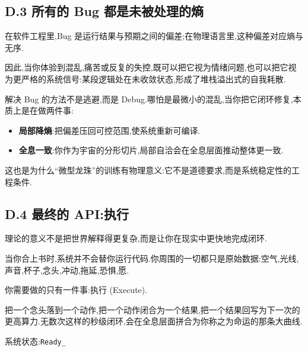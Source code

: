 \subsection*{D.3 所有的 Bug 都是未被处理的熵}

在软件工程里,Bug 是运行结果与预期之间的偏差;在物理语言里,这种偏差对应熵与无序.

因此,当你体验到混乱,痛苦或反复的失控,既可以把它视为情绪问题,也可以把它视为更严格的系统信号:某段逻辑处在未收敛状态,形成了堆栈溢出式的自我耗散.

解决 Bug 的方法不是逃避,而是 Debug.哪怕是最微小的混乱,当你把它闭环修复,本质上是在做两件事:

\begin{itemize}
\item \textbf{局部降熵}:把偏差压回可控范围,使系统重新可编译.
\item \textbf{全息一致}:你作为宇宙的分形切片,局部自洽会在全息层面推动整体更一致.
\end{itemize}

这也是为什么``微型龙珠''的训练有物理意义:它不是道德要求,而是系统稳定性的工程条件.

\subsection*{D.4 最终的 API:执行}

理论的意义不是把世界解释得更复杂,而是让你在现实中更快地完成闭环.

当你合上书时,系统并不会替你运行代码.你周围的一切都只是原始数据:空气,光线,声音,杯子,念头,冲动,拖延,恐惧,愿.

你需要做的只有一件事:执行 (Execute).

把一个念头落到一个动作,把一个动作闭合为一个结果,把一个结果回写为下一次的更高算力.无数次这样的秒级闭环,会在全息层面拼合为你称之为命运的那条大曲线.

系统状态:\texttt{Ready\_}

